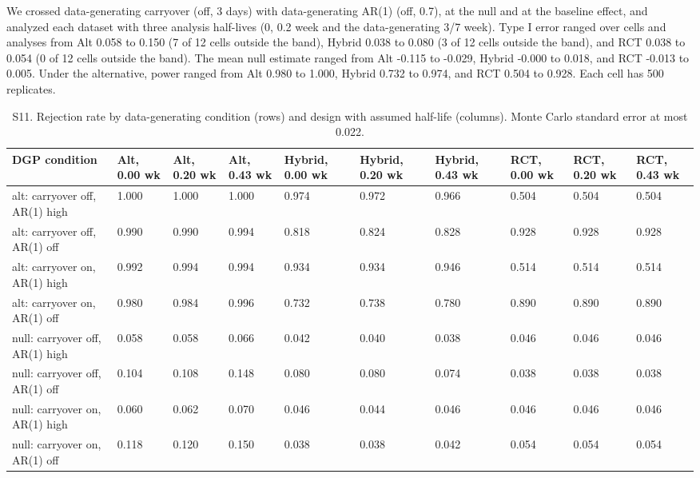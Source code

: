 \documentclass[
  11pt,
]{article}
\begin{document}
We crossed data-generating carryover (off, 3 days) with data-generating AR(1) (off, 0.7), at the null and at the baseline effect, and analyzed each dataset with three analysis half-lives (0, 0.2 week and the data-generating 3/7 week). Type I error ranged over cells and analyses from Alt 0.058 to 0.150 (7 of 12 cells outside the band), Hybrid 0.038 to 0.080 (3 of 12 cells outside the band), and RCT 0.038 to 0.054 (0 of 12 cells outside the band). The mean null estimate ranged from Alt -0.115 to -0.029, Hybrid -0.000 to 0.018, and RCT -0.013 to 0.005. Under the alternative, power ranged from Alt 0.980 to 1.000, Hybrid 0.732 to 0.974, and RCT 0.504 to 0.928. Each cell has 500 replicates.

\begin{table}
\centering
\caption{\label{tab:s11-tab}S11. Rejection rate by data-generating condition (rows) and design with assumed half-life (columns). Monte Carlo standard error at most 0.022.}
\centering
\fontsize{6}{8}\selectfont
\begin{tabular}[t]{llllllllll}
\toprule
DGP condition & Alt, 0.00 wk & Alt, 0.20 wk & Alt, 0.43 wk & Hybrid, 0.00 wk & Hybrid, 0.20 wk & Hybrid, 0.43 wk & RCT, 0.00 wk & RCT, 0.20 wk & RCT, 0.43 wk\\
\midrule
alt: carryover off, AR(1) high & 1.000 & 1.000 & 1.000 & 0.974 & 0.972 & 0.966 & 0.504 & 0.504 & 0.504\\
alt: carryover off, AR(1) off & 0.990 & 0.990 & 0.994 & 0.818 & 0.824 & 0.828 & 0.928 & 0.928 & 0.928\\
alt: carryover on, AR(1) high & 0.992 & 0.994 & 0.994 & 0.934 & 0.934 & 0.946 & 0.514 & 0.514 & 0.514\\
alt: carryover on, AR(1) off & 0.980 & 0.984 & 0.996 & 0.732 & 0.738 & 0.780 & 0.890 & 0.890 & 0.890\\
null: carryover off, AR(1) high & 0.058 & 0.058 & 0.066 & 0.042 & 0.040 & 0.038 & 0.046 & 0.046 & 0.046\\
\addlinespace
null: carryover off, AR(1) off & 0.104 & 0.108 & 0.148 & 0.080 & 0.080 & 0.074 & 0.038 & 0.038 & 0.038\\
null: carryover on, AR(1) high & 0.060 & 0.062 & 0.070 & 0.046 & 0.044 & 0.046 & 0.046 & 0.046 & 0.046\\
null: carryover on, AR(1) off & 0.118 & 0.120 & 0.150 & 0.038 & 0.038 & 0.042 & 0.054 & 0.054 & 0.054\\
\bottomrule
\end{tabular}
\end{table}
\end{document}
